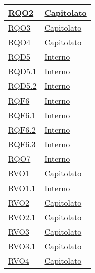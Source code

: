 \begin{longtable}{|>{\centering}m{5cm}|m{5cm}<{\centering}|}
\hyperlink{RQO2}{RQO2} & \hyperlink{Capitolato}{Capitolato}\\ \hline

\hyperlink{RQO3}{RQO3} & \hyperlink{Capitolato}{Capitolato}\\ \hline

\hyperlink{RQO4}{RQO4} & \hyperlink{Capitolato}{Capitolato}\\ \hline

\hyperlink{RQD5}{RQD5} & \hyperlink{Interno}{Interno}\\ \hline

\hyperlink{RQD5.1}{RQD5.1} & \hyperlink{Interno}{Interno}\\ \hline

\hyperlink{RQD5.2}{RQD5.2} & \hyperlink{Interno}{Interno}\\ \hline

\hyperlink{RQF6}{RQF6} & \hyperlink{Interno}{Interno}\\ \hline

\hyperlink{RQF6.1}{RQF6.1} & \hyperlink{Interno}{Interno}\\ \hline

\hyperlink{RQF6.2}{RQF6.2} & \hyperlink{Interno}{Interno}\\ \hline

\hyperlink{RQF6.3}{RQF6.3} & \hyperlink{Interno}{Interno}\\ \hline

\hyperlink{RQO7}{RQO7} & \hyperlink{Interno}{Interno}\\ \hline

\hyperlink{RVO1}{RVO1} & \hyperlink{Capitolato}{Capitolato}\\ \hline

\hyperlink{RVO1.1}{RVO1.1} & \hyperlink{Interno}{Interno}\\ \hline

\hyperlink{RVO2}{RVO2} & \hyperlink{Capitolato}{Capitolato}\\ \hline

\hyperlink{RVO2.1}{RVO2.1} & \hyperlink{Capitolato}{Capitolato}\\ \hline

\hyperlink{RVO3}{RVO3} & \hyperlink{Capitolato}{Capitolato}\\ \hline

\hyperlink{RVO3.1}{RVO3.1} & \hyperlink{Capitolato}{Capitolato}\\ \hline

\hyperlink{RVO4}{RVO4} & \hyperlink{Capitolato}{Capitolato}\\ \hline


\end{longtable}
